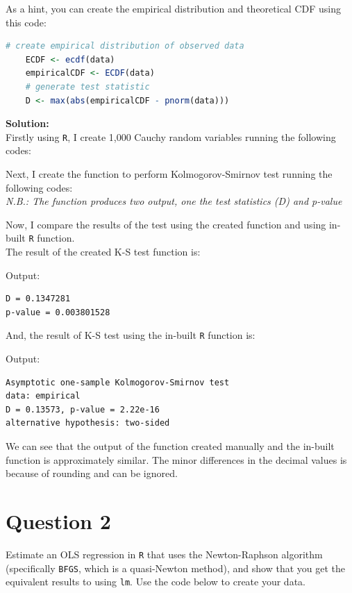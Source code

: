 \documentclass[12pt,letterpaper]{article}
\begin{document}
	
\noindent As a hint, you can create the empirical distribution and theoretical CDF using this code:

\begin{lstlisting}[language=R]
	# create empirical distribution of observed data
	ECDF <- ecdf(data)
	empiricalCDF <- ECDF(data)
	# generate test statistic
	D <- max(abs(empiricalCDF - pnorm(data))) \end{lstlisting}

\vspace*{.2cm}
\noindent\textbf{Solution:\\}
Firstly using \texttt{R}, I create 1,000 Cauchy random variables running the following codes:


\noindent Next, I create the function to perform Kolmogorov-Smirnov test running the following codes:\\
\textit{N.B.: The function produces two output, one the test statistics (D) and p-value}


\noindent Now, I compare the results of the test using the created function and using in-built \texttt{R} function.\\
The result of the created K-S test function is:


\noindent Output:
\begin{lstlisting}
D = 0.1347281
p-value = 0.003801528\end{lstlisting}
And, the result of K-S test using the in-built \texttt{R} function is:


\noindent Output:
\begin{lstlisting}
Asymptotic one-sample Kolmogorov-Smirnov test
data: empirical
D = 0.13573, p-value = 2.22e-16
alternative hypothesis: two-sided\end{lstlisting}
We can see that the output of the function created manually and the in-built function is approximately similar. The minor differences in the decimal values is because of rounding and can be ignored. 
\vspace{1cm}

\section*{Question 2}
\noindent Estimate an OLS regression in \texttt{R} that uses the Newton-Raphson algorithm (specifically \texttt{BFGS}, which is a quasi-Newton method), and show that you get the equivalent results to using \texttt{lm}. Use the code below to create your data.
\vspace{.5cm}
 
\end{document}
